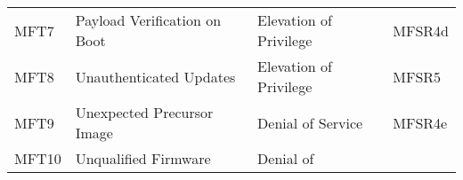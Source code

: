 \documentclass[0-thesis.tex]{subfiles}
\begin{document}
\begin{longtable}[]{@{}llll@{}}
    \begin{minipage}[t]{0.05\columnwidth}\raggedright\strut MFT7\strut \end{minipage} &
    \begin{minipage}[t]{0.44\columnwidth}\raggedright\strut Payload Verification on
    Boot\strut \end{minipage} & \begin{minipage}[t]{0.30\columnwidth}\raggedright\strut
    Elevation of Privilege\strut \end{minipage} &
    \begin{minipage}[t]{0.09\columnwidth}\raggedright\strut MFSR4d\strut
    \end{minipage}\tabularnewline
    \begin{minipage}[t]{0.05\columnwidth}\raggedright\strut MFT8\strut \end{minipage} &
    \begin{minipage}[t]{0.44\columnwidth}\raggedright\strut Unauthenticated Updates\strut
    \end{minipage} & \begin{minipage}[t]{0.30\columnwidth}\raggedright\strut Elevation of
    Privilege\strut \end{minipage} &
    \begin{minipage}[t]{0.09\columnwidth}\raggedright\strut MFSR5\strut
    \end{minipage}\tabularnewline
    \begin{minipage}[t]{0.05\columnwidth}\raggedright\strut MFT9\strut \end{minipage} &
    \begin{minipage}[t]{0.44\columnwidth}\raggedright\strut Unexpected Precursor
    Image\strut \end{minipage} & \begin{minipage}[t]{0.30\columnwidth}\raggedright\strut
    Denial of Service\strut \end{minipage} &
    \begin{minipage}[t]{0.09\columnwidth}\raggedright\strut MFSR4e\strut
    \end{minipage}\tabularnewline
    \begin{minipage}[t]{0.05\columnwidth}\raggedright\strut MFT10\strut \end{minipage} &
    \begin{minipage}[t]{0.44\columnwidth}\raggedright\strut Unqualified Firmware\strut
    \end{minipage} & \begin{minipage}[t]{0.30\columnwidth}\raggedright\strut Denial of

\end{minipage}
\end{longtable}
\end{document}

